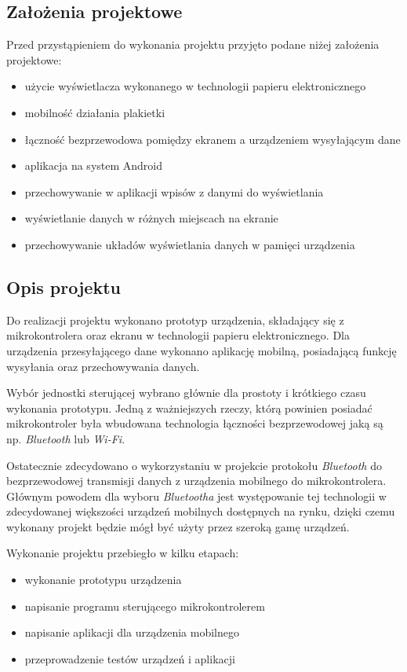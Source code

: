 \documentclass[a4paper,12pt, twoside]{article}
\begin{document}
    	\subsection{Założenia projektowe}
    	Przed przystąpieniem do wykonania projektu przyjęto podane niżej założenia projektowe:
    	\begin{itemize}
    		\item użycie wyświetlacza wykonanego w technologii papieru elektronicznego
    		\item mobilność działania plakietki 
    		\item łączność bezprzewodowa pomiędzy ekranem a urządzeniem wysyłającym dane
    		\item aplikacja na system Android
    		\item przechowywanie w aplikacji wpisów z danymi do wyświetlania
    		\item wyświetlanie danych w różnych miejscach na ekranie 
    		\item przechowywanie układów wyświetlania danych w pamięci urządzenia
    	\end{itemize}
    	
    	\subsection{Opis projektu}
    	Do realizacji projektu wykonano prototyp urządzenia, składający się z mikrokontrolera oraz ekranu w technologii papieru elektronicznego. Dla urządzenia przesyłającego dane wykonano aplikację mobilną, posiadającą funkcję wysyłania oraz przechowywania danych. 
    	
    	Wybór jednostki sterującej wybrano głównie dla prostoty i krótkiego czasu wykonania prototypu. Jedną z ważniejszych rzeczy, którą powinien posiadać mikrokontroler była wbudowana technologia łączności bezprzewodowej  jaką są np. \textit{Bluetooth}\cite{bluetooth} lub \textit{Wi-Fi}\cite{wifi}. 
    	
    	Ostatecznie zdecydowano o wykorzystaniu w projekcie protokołu \textit{Bluetooth} do bezprzewodowej transmisji danych z urządzenia mobilnego do mikrokontrolera. Głównym powodem dla wyboru \textit{Bluetootha} jest występowanie tej technologii w zdecydowanej większości urządzeń mobilnych dostępnych na rynku, dzięki czemu wykonany projekt będzie mógł być użyty przez szeroką gamę urządzeń.
    	
    	\begin{flushleft}
    	Wykonanie projektu przebiegło w kilku etapach:
    	\begin{itemize}
    	    \item wykonanie prototypu urządzenia
    	    \item napisanie programu sterującego mikrokontrolerem
    	    \item napisanie aplikacji dla urządzenia mobilnego
    	    \item przeprowadzenie testów urządzeń i aplikacji
    	\end{itemize}
    	\end{flushleft}
    	
\end{document}

